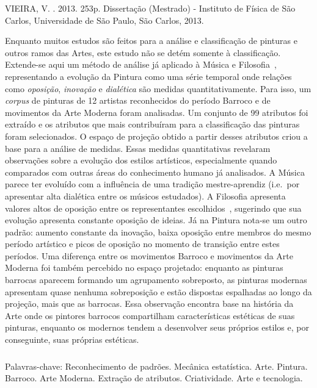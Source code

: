 \begin{resumo2}
\vspace{-10mm}
VIEIRA, V. \textbf{\ABNTtitulodata}. 2013. 253p. Dissertação (Mestrado) - Instituto de Física de São Carlos, Universidade de São Paulo, São Carlos, 2013.
\vspace{15mm}

Enquanto muitos estudos são feitos para a análise e classificação de
pinturas e outros ramos das Artes, este estudo não se detém somente à
classificação. Extende-se aqui um método de análise já aplicado à
Música e Filosofia~\cite{vieira}, representando a evolução da Pintura
como uma série temporal onde relações como \textit{oposição},
\textit{inovação} e \textit{dialética} são medidas
quantitativamente. Para isso, um \textit{corpus} de pinturas de 12
artistas reconhecidos do período Barroco e de movimentos da Arte
Moderna foram analisadas. Um conjunto de 99 atributos foi extraído e
os atributos que mais contribuíram para a classificação das pinturas
foram selecionados. O espaço de projeção obtido a partir desses
atributos criou a base para a análise de medidas. Essas medidas
quantitativas revelaram observações sobre a evolução dos estilos
artísticos, especialmente quando comparados com outras áreas do
conhecimento humano já analisados. A Música parece ter evoluído com a
influência de uma tradição mestre-aprendiz (i.e.\ por apresentar alta
dialética entre os músicos estudados). A Filosofia apresenta valores
altos de oposição entre os representantes escolhidos~\cite{vieira},
sugerindo que sua evolução apresenta constante oposição de ideias. Já
na Pintura nota-se um outro padrão: aumento constante da inovação,
baixa oposição entre membros do mesmo período artístico e picos de
oposição no momento de transição entre estes períodos. Uma diferença
entre os movimentos Barroco e movimentos da Arte Moderna foi também
percebido no espaço projetado: enquanto as pinturas barrocas aparecem
formando um agrupamento sobreposto, as pinturas modernas apresentam
quase nenhuma sobreposição e estão dispostas espalhadas ao longo da
projeção, mais que as barrocas. Essa observação encontra base na
história da Arte onde os pintores barrocos compartilham
características estéticas de suas pinturas, enquanto os modernos
tendem a desenvolver seus próprios estilos e, por conseguinte, suas
próprias estéticas.

$\phantom{linha em branco}$\\ Palavras-chave: Reconhecimento de
padrões. Mecânica estatística. Arte. Pintura. Barroco. Arte
Moderna. Extração de atributos. Criatividade. Arte e tecnologia.

\end{resumo2}


